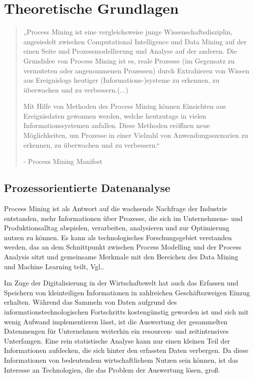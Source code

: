 \chapter{Theoretische Grundlagen}\label{chap:relatedwork}
\fontsize{11}{12}\selectfont\begin{quote}„Process Mining ist eine vergleichsweise junge Wissenschaftsdisziplin, angesiedelt zwischen Computational Intelligence und Data Mining auf der einen Seite und Prozessmodellierung und Analyse auf der anderen. Die Grundidee von Process Mining ist es, reale Prozesse (im Gegensatz zu vermuteten oder angenommenen Prozessen) durch Extrahieren von Wissen aus Ereignislogs heutiger (Informations-)systeme zu erkennen, zu überwachen und zu verbessern.(...) 

Mit Hilfe von Methoden des Process Mining können Einsichten aus Ereignisdaten gewonnen werden, welche heutzutage in vielen Informationssystemen anfallen. Diese Methoden eröffnen neue Möglichkeiten, um Prozesse in einer Vielzahl von Anwendungsszenarien zu erkennen, zu überwachen und zu verbessern.“

- Process Mining Manifest \cite{PMManifesto}\end{quote}
\section{Prozessorientierte Datenanalyse}
Process Mining ist als Antwort auf die wachsende Nachfrage der Industrie entstanden, mehr Informationen über Prozesse, die sich im Unternehmens- und Produktionsalltag abspielen, verarbeiten, analysieren und zur Optimierung nutzen zu können. Es kann als technologisches Forschungsgebiet verstanden werden, das an dem Schnittpunkt zwischen Process Modelling und der Process Analysis sitzt und gemeinsame Merkmale mit den Bereichen des Data Mining und Machine Learning teilt, Vgl.\cite{Ailenei}.

Im Zuge der Digitalisierung in der Wirtschaftswelt hat auch das Erfassen und Speichern von kleinteiligen Informationen in zahlreichen Geschäftszweigen Einzug erhalten. Während das Sammeln von Daten aufgrund des informationstechnologischen Fortschritts kostengünstig geworden ist und sich mit wenig Aufwand implementieren lässt, ist die Auswertung der gesammelten Datenmengen für Unternehmen weiterhin ein resourcen- und zeitintensives Unterfangen. 
Eine rein statistische Analyse kann nur einen kleinen Teil der Informationen aufdecken, die sich hinter den erfassten Daten verbergen. Da diese Informationen von bedeutendem wirtschaftlichem Nutzen sein können, ist das Interesse an Technologien, die das Problem der Auswertung lösen, groß.

